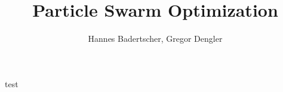 \documentclass{article}
\title{Particle Swarm Optimization}
\author{Hannes Badertscher, Gregor Dengler}
\begin{document}
	
	
	
	test
	
\end{document}
